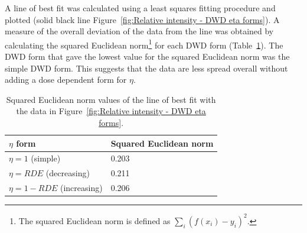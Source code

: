 A line of best fit was calculated using a least squares fitting procedure and plotted (solid black line Figure~\ref{fig:Relative intensity - DWD eta forms}).
A measure of the overall deviation of the data from the line was obtained by calculating the squared Euclidean norm\footnote{The squared Euclidean norm is defined as $\sum_i (f(x_i) - y_i)^2$.} for each DWD form (Table~\ref{tab:Squared Euclidean norm values - Relative intensity fits}).
The DWD form that gave the lowest value for the squared Euclidean norm was the simple DWD form.
This suggests that the data are less spread overall without adding a dose dependent form for $\eta$.
\begin{table}[ht!]
\small
\captionsetup{justification=centering}
	\caption[Squared Euclidean norm values representing the scatter of the relative intensity data from the line of best fit.]{Squared Euclidean norm values of the line of best fit with the data in Figure~\ref{fig:Relative intensity - DWD eta forms}.}
	\centering
	\begin{tabular}{p{5cm} p{4.5cm}}
		$\eta$ form			                & Squared Euclidean norm    \\
		\hline
		$\eta = 1$ (simple)     			& 0.203        \\
		$\eta = RDE$ (decreasing)     	    & 0.211        \\
		$\eta = 1-RDE$ (increasing)    		& 0.206       \\
		\hline
	\end{tabular}
	\label{tab:Squared Euclidean norm values - Relative intensity fits}
\end{table}

